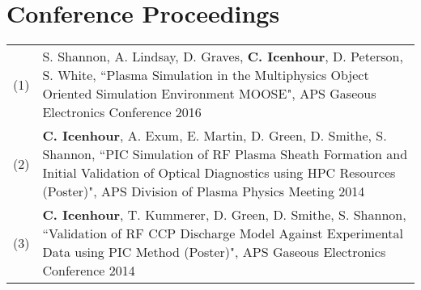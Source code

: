 \documentclass{article}
\begin{document}
\section*{Conference Proceedings}

	\begin{tabularx}{\textwidth}{l X}
		(1)  &  S. Shannon, A. Lindsay, D. Graves, \textbf{C. Icenhour}, D. Peterson, S. White, ``Plasma Simulation in the Multiphysics Object Oriented Simulation Environment MOOSE", APS Gaseous Electronics Conference 2016 \\
		(2)  &  \textbf{C. Icenhour}, A. Exum, E. Martin, D. Green, D. Smithe, S. Shannon, ``PIC Simulation of RF Plasma Sheath Formation and Initial Validation of Optical Diagnostics using HPC Resources (Poster)", APS Division of Plasma Physics Meeting 2014 \\
		(3)  &  \textbf{C. Icenhour}, T. Kummerer, D. Green, D. Smithe, S. Shannon, ``Validation of RF CCP Discharge Model Against Experimental Data using PIC Method (Poster)", APS Gaseous Electronics Conference 2014
	\end{tabularx}
\end{document}
